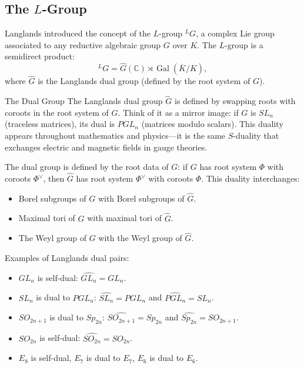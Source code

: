 \subsection{The \texorpdfstring{$L$}{L}-Group}

Langlands introduced the concept of the $L$-group ${}^L G$, a complex Lie group associated to any reductive algebraic group $G$ over $K$. The $L$-group is a semidirect product:
\[
{}^L G = \widehat{G}(\mathbb{C}) \rtimes \operatorname{Gal}(\overline{K}/K),
\]
where $\widehat{G}$ is the Langlands dual group (defined by the root system of $G$).

\begin{primer}{The Dual Group}
The Langlands dual group $\widehat{G}$ is defined by swapping roots
with coroots in the root system of $G$. Think of it as a mirror image:
if $G$ is $SL_n$ (traceless matrices), its dual is $PGL_n$
(matrices modulo scalars). This duality appears throughout mathematics
and physics---it is the same $S$-duality that exchanges electric
and magnetic fields in gauge theories.
\end{primer}

The dual group is defined by the root data of $G$: if $G$ has root system $\Phi$ with coroots $\Phi^\vee$, then $\widehat{G}$ has root system $\Phi^\vee$ with coroots $\Phi$. This duality interchanges:
\begin{itemize}
\item Borel subgroups of $G$ with Borel subgroups of $\widehat{G}$.
\item Maximal tori of $G$ with maximal tori of $\widehat{G}$.
\item The Weyl group of $G$ with the Weyl group of $\widehat{G}$.
\end{itemize}

Examples of Langlands dual pairs:
\begin{itemize}
\item $GL_n$ is self-dual: $\widehat{GL_n} = GL_n$.
\item $SL_n$ is dual to $PGL_n$: $\widehat{SL_n} = PGL_n$ and $\widehat{PGL_n} = SL_n$.
\item $SO_{2n+1}$ is dual to $Sp_{2n}$: $\widehat{SO_{2n+1}} = Sp_{2n}$ and $\widehat{Sp_{2n}} = SO_{2n+1}$.
\item $SO_{2n}$ is self-dual: $\widehat{SO_{2n}} = SO_{2n}$.
\item $E_8$ is self-dual, $E_7$ is dual to $E_7$, $E_6$ is dual to $E_6$.
\end{itemize}

